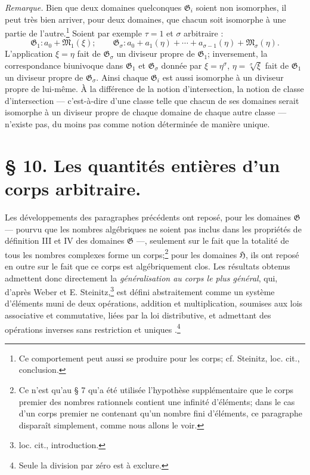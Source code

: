 \emph{Remarque.} Bien que deux domaines quelconques $\mathfrak G_i$ soient non isomorphes, il peut très bien arriver, pour deux domaines, que chacun soit isomorphe à une partie de l'autre.\footnote{Ce comportement peut aussi se produire pour les corps; cf. Steinitz, loc. cit., conclusion.} Soient par exemple $\tau=1$ et $\sigma$ arbitraire :
\[
\mathfrak G_1:a_0+\mathfrak M_1(\xi);\qquad
\mathfrak G_\sigma:a_0+a_1(\eta)+\cdots+a_{\sigma-1}(\eta)+\mathfrak M_\sigma(\eta).
\]
L'application $\xi=\eta$ fait de $\mathfrak G_\sigma$ un diviseur propre de $\mathfrak G_1$; inversement, la correspondance biunivoque dans $\mathfrak G_1$ et $\mathfrak G_\sigma$ donnée par $\xi=\eta^\sigma$, $\eta=\sqrt[\sigma]{\xi}$ fait de $\mathfrak G_1$ un diviseur propre de $\mathfrak G_\sigma$. Ainsi chaque $\mathfrak G_i$ est aussi isomorphe à un diviseur propre de lui-même. À la différence de la notion d'intersection, la notion de classe d'intersection --- c'est-à-dire d'une classe telle que chacun de ses domaines serait isomorphe à un diviseur propre de chaque domaine de chaque autre classe --- n'existe pas, du moins pas comme notion déterminée de manière unique.

\section*{\S{} 10. Les quantités entières d'un corps arbitraire.}

Les développements des paragraphes précédents ont reposé, pour les domaines $\mathfrak G$ --- pourvu que les nombres algébriques ne soient pas inclus dans les propriétés de définition III et IV des domaines $\mathfrak G$ ---, seulement sur le fait que la totalité de tous les nombres complexes forme un corps;\footnote{Ce n'est qu'au \S{} 7 qu'a été utilisée l'hypothèse supplémentaire que le \og{} corps premier \fg{} des nombres rationnels contient une infinité d'éléments; dans le cas d'un corps premier ne contenant qu'un nombre fini d'éléments, ce paragraphe disparaît simplement, comme nous allons le voir.} pour les domaines $\mathfrak H$, ils ont reposé en outre sur le fait que ce corps est algébriquement clos. Les résultats obtenus admettent donc directement la \emph{généralisation au corps le plus général}, qui, d'après Weber et E. Steinitz,\footnote{loc. cit., introduction.} est défini abstraitement comme \og{} un système d'éléments muni de deux opérations, addition et multiplication, soumises aux lois associative et commutative, liées par la loi distributive, et admettant des opérations inverses sans restriction et uniques \fg{}.\footnote{Seule la division par zéro est à exclure.}


